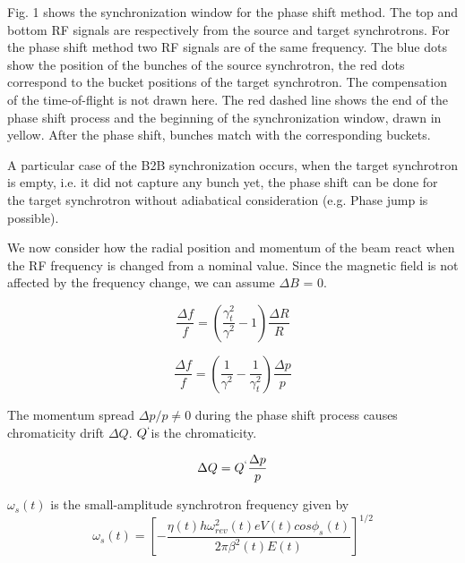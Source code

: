 Fig. 1 shows the synchronization window for the phase shift method. The top and bottom RF signals are respectively from the source and target synchrotrons. For the phase shift method two RF signals are of the same frequency. The blue dots show the position of the bunches of the source synchrotron, the red dots correspond to the bucket positions of the target synchrotron. The compensation of the time-of-flight is not drawn here. The red dashed line shows the end of the phase shift process and the beginning of the synchronization window, drawn in yellow. After the phase shift, bunches match with the corresponding buckets.  

A particular case of the B2B synchronization occurs, when the target synchrotron is empty, i.e. it did not capture any bunch yet, the phase shift can be done for the target synchrotron without adiabatical consideration (e.g. Phase jump is possible).

We now consider how the radial position and momentum of the beam react when the RF frequency is changed from a nominal value. Since the magnetic field is not affected by the frequency change, we can assume $\Delta{B}$ = 0.

\begin{equation}
\label{eq:phaseR}
\frac{\Delta{f}}{f} =({\frac{\gamma_t^2}{\gamma^2}-1}) \frac{\Delta{R}}{R}
\end{equation}

\begin{equation}
\frac{\Delta{f}}{f} = (\frac{1}{\gamma^2}-\frac{1}{\gamma_t^2})\frac{\Delta{p}}{p}
\label{eq:phaseP}
\end{equation}


The momentum spread ${\Delta{p}}/{p} \neq 0$ during the phase shift process causes chromaticity drift $\Delta{Q}$. $Q^`$is the chromaticity.

\begin{equation}
\Delta{Q} = Q^`\frac{\Delta{p}}{p}
\label{eq:chromaticity}
\end{equation} 

$\omega_s(t)$ is the small-amplitude synchrotron frequency given by
\begin{equation}
\omega_s(t) =[{-\frac{\eta(t)h\omega_{rev}^2(t)eV(t)cos{\phi_s(t)}}{2\pi\beta^2(t)E(t)}}]^{1/2}
\label{eq:synchfreq}
\end{equation} 

